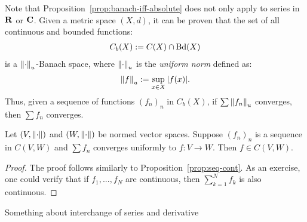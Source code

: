 \documentclass[11pt,twoside,openany]{memoir}
\begin{document}
    \begin{example}
        Note that Proposition~\ref{prop:banach-iff-absolute} does not only apply to series in $\mathbf{R}$ or $\mathbf{C}$. Given a metric space $(X,d)$, it can be proven that the set of all continuous and bounded functions:
        \begin{equation*}
        \begin{split}
            C_b(X) := C(X) \cap \operatorname{Bd}(X)
        \end{split}
        \end{equation*}
    is a $\left\lVert \cdot \right\rVert_u$-Banach space, where $\left\lVert \cdot \right\rVert_u$ is the \textit{uniform norm} defined as:
        \begin{equation*}
        \begin{split}
            \left\lVert f \right\rVert_u := \sup_{x \in X}|f(x)|.
        \end{split}
        \end{equation*}
    Thus, given a sequence of functions $(f_n)_n$ in $C_b(X)$, if $\sum \left\lVert f_n \right\rVert_u$ converges, then $\sum f_n$ converges.
    \end{example}

    \begin{proposition}
        Let $(V,\left\lVert \cdot \right\rVert)$ and $(W,\left\lVert \cdot \right\rVert)$ be normed vector spaces. Suppose $(f_n)_n$ is a sequence in $C(V,W)$ and $\sum f_n$ converges uniformly to $f:V \rightarrow W$. Then $f \in C(V,W)$.
    \end{proposition}
        \begin{proof}
            The proof follows similarly to Proposition~\ref{prop:seq-cont}. As an exercise, one could verify that if $f_1,...,f_N$ are continuous, then $\sum_{k = 1}^N f_k$ is also continuous.
        \end{proof}

    \begin{theorem}
        Something about interchange of series and derivative
    \end{theorem}
\end{document}
